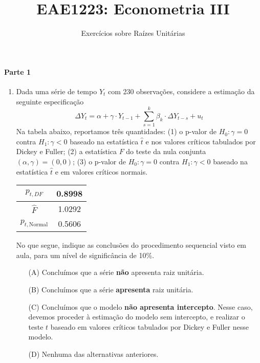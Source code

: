 \documentclass[10pt,a4paper]{article}
\title{\large EAE1223: Econometria III}
\author{\normalsize Exercícios sobre Raízes Unitárias}
\date{}
\begin{document}
	\maketitle
	\paragraph{Parte 1}\begin{enumerate}
		
		\item Dada uma série de tempo $Y_t$ com 230 observações, considere a estimação da seguinte especificação
		\begin{equation}
			\Delta Y_t = \alpha + \gamma \cdot Y_{t-1} + \sum_{s=1}^k \beta_k \cdot \Delta Y_{t-s} + u_t
		\end{equation}
		Na tabela abaixo, reportamos três quantidades: (1) o p-valor de $H_0: \gamma = 0$ contra $H_1: \gamma < 0$ baseado na estatística $\hat{t}$ e nos valores críticos tabulados por Dickey e Fuller; (2) a estatística $F$ do teste da nula conjunta $(\alpha, \gamma) = (0,0)$; (3) o p-valor de $H_0: \gamma = 0$ contra $H_1: \gamma < 0$ baseado na estatística $\hat{t}$ e em valores críticos normais.
		
		
		\begin{table}[H]
			\begin{center}
				\begin{tabular}{c|c}
					
					$p_{t,DF}$&0.8998    \\
					\hline
					$\hat{F}$&1.0292    \\
					\hline
					$p_{t,\text{Normal}}$&0.5606\\
				\end{tabular}
			\end{center}
		\end{table}
		No que segue, indique as conclusões do procedimento sequencial visto em aula, para um nível de significância de 10\%.
		\begin{enumerate}
			\item[(A)] Concluímos que a série \textbf{não} apresenta raiz unitária.
			\item[(B)] Concluímos que a série \textbf{apresenta} raiz unitária.
			\item[(C)] Concluímos que o modelo \textbf{não apresenta intercepto}. Nesse caso, devemos proceder à estimação do modelo sem intercepto, e realizar o teste $t$ baseado em valores críticos tabulados por Dickey e Fuller nesse modelo.
			\item[(D)] Nenhuma das alternativas anteriores.
		\end{enumerate}


\end{enumerate}
\end{document}
